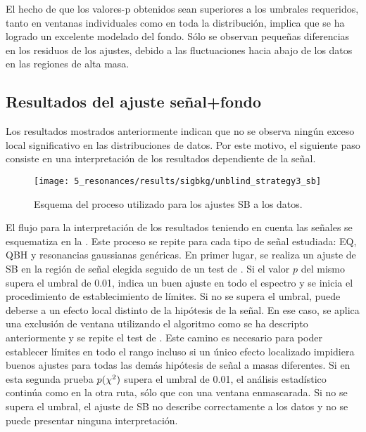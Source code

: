 El hecho de que los valores-p obtenidos sean superiores a los umbrales requeridos, tanto en ventanas individuales como en toda la distribución, implica que se ha logrado un excelente modelado del fondo. Sólo se observan pequeñas diferencias en los residuos de los ajustes, debido a las fluctuaciones hacia abajo de los datos en las regiones de alta masa.









\subsection{Resultados del ajuste señal+fondo}
\label{subsec:results:results:bkgsig}

Los resultados mostrados anteriormente indican que no se observa ningún exceso local significativo en las distribuciones de datos. Por este motivo, el siguiente paso consiste en una interpretación de los resultados dependiente de la señal.

\begin{figure}[ht!]
    \centering
    \texttt{[image: 5\_resonances/results/sigbkg/unblind\_strategy3\_sb]}
    \caption{Esquema del proceso utilizado para los ajustes \ac{SB} a los datos.}
    \label{fig:results:results:bkgsig:strat}
\end{figure}

El flujo para la interpretación de los resultados teniendo en cuenta las señales se esquematiza en la \Fig{\ref{fig:results:results:bkgsig:strat}}. Este proceso se repite para cada tipo de señal estudiada: \acf{EQ}, \acf{QBH} y resonancias gaussianas genéricas.
En primer lugar, se realiza un ajuste de \ac{SB} en la región de señal elegida seguido de un test de \chisq. Si el valor \(p\) del mismo supera el umbral de 0.01, indica un buen ajuste en todo el espectro y se inicia el procedimiento de establecimiento de límites. Si no se supera el umbral, puede deberse a un efecto local distinto de la hipótesis de la señal. En ese caso, se aplica una exclusión de ventana utilizando el algoritmo \bh como se ha descripto anteriormente y se repite el test de \chisq. Este camino es necesario para poder establecer límites en todo el rango \myj incluso si un único efecto localizado impidiera buenos ajustes para todas las demás hipótesis de señal a masas diferentes. Si en esta segunda prueba \(p(\chi^{2})\) supera el umbral de 0.01, el análisis estadístico continúa como en la otra ruta, sólo que con una ventana enmascarada. Si no se supera el umbral, el ajuste de \ac{SB} no describe correctamente a los datos y no se puede presentar ninguna interpretación.

